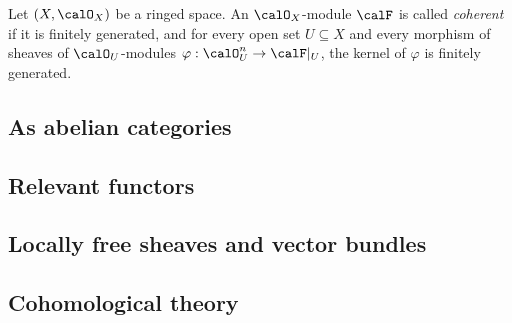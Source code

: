     \begin{definition}\label{def:coherent_sheaf}
        Let \((X,\calO_X)\) be a ringed space.
        An \(\calO_X\)-module \(\calF\) is called \emph{coherent} if it is finitely generated, and for every open set \(U\subseteq X\) and every morphism of sheaves of \(\calO_U\)-modules \(\varphi:\calO_U^n \to \calF|_U\), the kernel of \(\varphi\) is finitely generated.
    \end{definition}

\subsection{As abelian categories}

    

\subsection{Relevant functors}

    

\subsection{Locally free sheaves and vector bundles}

    

\subsection{Cohomological theory}

    